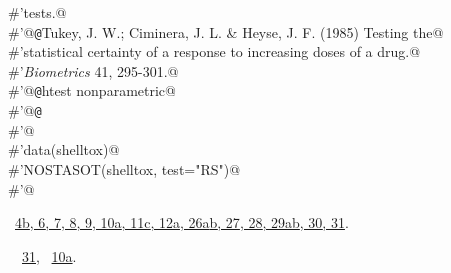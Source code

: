 \documentclass[reqno]{amsart}
\renewcommand{\NWlink}[2]{\hyperlink{#1}{#2}}
\begin{document}
\begin{flushleft}
\begin{list}{}{}
\mbox{}\verb@#'tests.@\\
\mbox{}\verb@#'@{\tt @}\verb@references Tukey, J. W.; Ciminera, J. L. & Heyse, J. F. (1985) Testing the@\\
\mbox{}\verb@#'statistical certainty of a response to increasing doses of a drug.@\\
\mbox{}\verb@#'\emph{Biometrics} 41, 295-301.@\\
\mbox{}\verb@#'@{\tt @}\verb@keywords htest nonparametric@\\
\mbox{}\verb@#'@{\tt @}\verb@examples@\\
\mbox{}\verb@#'@\\
\mbox{}\verb@#'data(shelltox)@\\
\mbox{}\verb@#'NOSTASOT(shelltox, test="RS")@\\
\mbox{}\verb@#'@\\
\mbox{}\verb@@{\NWsep}
\end{list}
\vspace{-1.5ex}
\footnotesize
\begin{list}{}{\setlength{\itemsep}{-\parsep}\setlength{\itemindent}{-\leftmargin}}
\item \NWtxtFileDefBy\ \NWlink{nuweb4b}{4b}\NWlink{nuweb6}{, 6}\NWlink{nuweb7}{, 7}\NWlink{nuweb8}{, 8}\NWlink{nuweb9}{, 9}\NWlink{nuweb10a}{, 10a}\NWlink{nuweb11c}{, 11c}\NWlink{nuweb12a}{, 12a}\NWlink{nuweb26a}{, 26a}\NWlink{nuweb26b}{b}\NWlink{nuweb27}{, 27}\NWlink{nuweb28}{, 28}\NWlink{nuweb29a}{, 29a}\NWlink{nuweb29b}{b}\NWlink{nuweb30}{, 30}\NWlink{nuweb31}{, 31}.
\item \NWtxtIdentsUsed\nobreak\  \verb@NOSTASOT@\nobreak\ \NWlink{nuweb31}{31}, \verb@soControl@\nobreak\ \NWlink{nuweb10a}{10a}.
\item{}
\end{list}
\vspace{4ex}
\end{flushleft}
\end{document}
